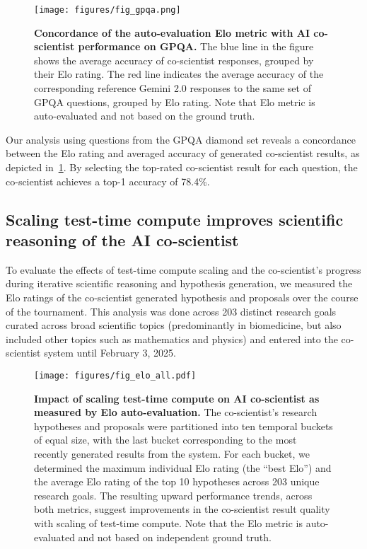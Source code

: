 \begin{figure}[htbp!]
\centering\texttt{[image: figures/fig\_gpqa.png]}
\vspace{0.1cm}
\caption{\textbf{Concordance of the auto-evaluation Elo metric with AI co-scientist performance on GPQA.} The blue line in the figure shows the average accuracy of co-scientist responses, grouped by their Elo rating. The red line indicates the average accuracy of the corresponding reference Gemini 2.0 responses to the same set of GPQA questions, grouped by Elo rating. Note that Elo metric is auto-evaluated and not based on the ground truth.}
\label{fig:fig_gpqa}
\end{figure}

Our analysis using questions from the GPQA diamond set reveals a concordance between the Elo rating and averaged accuracy of generated co-scientist results, as depicted in~\cref{fig:fig_gpqa}. By selecting the top-rated co-scientist result for each question, the co-scientist achieves a top-1 accuracy of 78.4\%.


\subsection{Scaling test-time compute improves scientific reasoning of the AI co-scientist}
\label{sec:result_ttc}
To evaluate the effects of test-time compute scaling and the co-scientist's progress during iterative scientific reasoning and hypothesis generation, we measured the Elo ratings of the co-scientist generated hypothesis and proposals over the course of the tournament. This analysis was done across 203 distinct research goals curated across broad scientific topics (predominantly in biomedicine, but also included other topics such as mathematics and physics) and entered into the co-scientist system until February 3, 2025.

\begin{figure}[ht!]
\centering
\texttt{[image: figures/fig\_elo\_all.pdf]}
\vspace{0.1cm}
\caption{\textbf{Impact of scaling test-time compute on AI co-scientist as measured by Elo auto-evaluation.} 
The co-scientist's research hypotheses and proposals were partitioned into ten temporal buckets of equal size, with the last bucket corresponding to the most recently generated results from the system. For each bucket, we determined the maximum individual Elo rating (the ``best Elo'') and the average Elo rating of the top 10 hypotheses across 203 unique research goals. The resulting upward performance trends, across both metrics, suggest improvements in the co-scientist result quality with scaling of test-time compute. Note that the Elo metric is auto-evaluated and not based on independent ground truth.}
\label{fig:fig_elo_all}
\end{figure}

